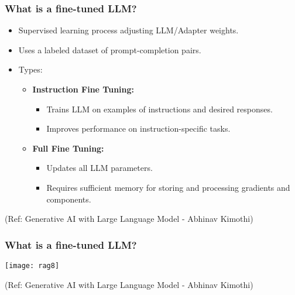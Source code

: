 \begin{frame}[fragile]\frametitle{What is a fine-tuned LLM?}


\begin{itemize}
  \item Supervised learning process adjusting LLM/Adapter weights.
  \item Uses a labeled dataset of prompt-completion pairs.
  \item Types:
  \begin{itemize}
	  \item \textbf{Instruction Fine Tuning:}
		\begin{itemize}
		  \item Trains LLM on examples of instructions and desired responses.
		  \item Improves performance on instruction-specific tasks.
		\end{itemize}

	  \item \textbf{Full Fine Tuning:}
		\begin{itemize}
		  \item Updates all LLM parameters.
		  \item Requires sufficient memory for storing and processing gradients and components.
		\end{itemize}
  \end{itemize}

\end{itemize}


{\tiny (Ref: Generative AI with Large Language Model - Abhinav  Kimothi)}

\end{frame}

\begin{frame}[fragile]\frametitle{What is a fine-tuned LLM?}


		\begin{center}
		\texttt{[image: rag8]}
		\end{center}

{\tiny (Ref: Generative AI with Large Language Model - Abhinav  Kimothi)}

\end{frame}





